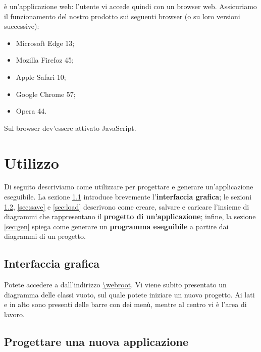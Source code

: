 \proj{} è un'applicazione web: l'utente vi accede quindi con un browser web. Assicuriamo il funzionamento del nostro prodotto sui seguenti browser (o su loro versioni successive):
\begin{itemize} %
	\item Microsoft Edge 13;
	\item Mozilla Firefoz 45;
	\item Apple Safari 10;
	\item Google Chrome 57;
	\item Opera 44.
\end{itemize}
Sul browser dev'essere attivato JavaScript.






\section{Utilizzo} \label{sec:utilizzo} %

Di seguito descriviamo come utilizzare \proj{} per progettare e generare un'applicazione eseguibile. La sezione \ref{sec:gui} introduce brevemente l'\textbf{interfaccia grafica}; le sezioni \ref{sec:new}, \ref{sec:save} e \ref{sec:load} descrivono come creare, salvare e caricare l'insieme di diagrammi che rappresentano il \textbf{progetto di un'applicazione}; infine, la sezione \ref{sec:gen} spiega come generare un \textbf{programma eseguibile} a partire dai diagrammi di un progetto.



\subsection{Interfaccia grafica} \label{sec:gui}

Potete accedere a \proj{} dall'indirizzo \url{\webroot}. Vi viene subito presentato un diagramma delle classi vuoto, sul quale potete iniziare un nuovo progetto. Ai lati e in alto sono presenti delle barre con dei menù, mentre al centro vi è l'area di lavoro.



\subsection{Progettare una nuova applicazione} \label{sec:new}

